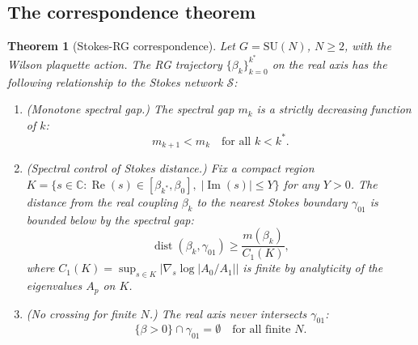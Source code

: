 \documentclass[12pt]{article}
\newtheorem{theorem}{Theorem}[section]
\theoremstyle{definition}
\theoremstyle{remark}
\newcommand{\SU}{\mathrm{SU}}
\newcommand{\re}{\operatorname{Re}}
\newcommand{\im}{\operatorname{Im}}
\newcommand{\dist}{\operatorname{dist}}
\newcommand{\C}{\mathbb{C}}
\begin{document}
\subsection{The correspondence theorem}

\begin{theorem}[Stokes-RG correspondence]
\label{thm:stokes_rg}
Let $G = \SU(N)$, $N \ge 2$, with the Wilson plaquette
action. The RG trajectory $\{\beta_k\}_{k=0}^{k^*}$ on the real
axis has the following relationship to the Stokes network
$\mathcal{S}$:
\begin{enumerate}[label=(\roman*)]
\item \emph{(Monotone spectral gap.)} The spectral gap $m_k$ is a
  strictly decreasing function of $k$:
  \begin{equation}\label{eq:gap_decrease}
  m_{k+1} < m_k \quad \text{for all } k < k^*.
  \end{equation}
\item \emph{(Spectral control of Stokes distance.)} Fix a compact
  region $K = \{s \in \C : \re(s) \in [\beta_{k^*}, \beta_0],\;
  |\im(s)| \le Y\}$ for any $Y > 0$.
  The distance from
  the real coupling $\beta_k$ to the nearest Stokes boundary
  $\gamma_{01}$ is bounded below by the spectral gap:
  \begin{equation}\label{eq:dist_decrease}
  \dist(\beta_k, \gamma_{01}) \ge \frac{m(\beta_k)}{C_1(K)},
  \end{equation}
  where $C_1(K) = \sup_{s \in K} |\nabla_s \log|A_0/A_1||$ is finite
  by analyticity of the eigenvalues $A_p$ on $K$.
\item \emph{(No crossing for finite $N$.)} The real axis never
  intersects $\gamma_{01}$:
  \begin{equation}\label{eq:no_crossing}
  \{\beta > 0\} \cap \gamma_{01} = \emptyset
  \quad \text{for all finite } N.
  \end{equation}
\end{enumerate}
\end{theorem}
\end{document}
